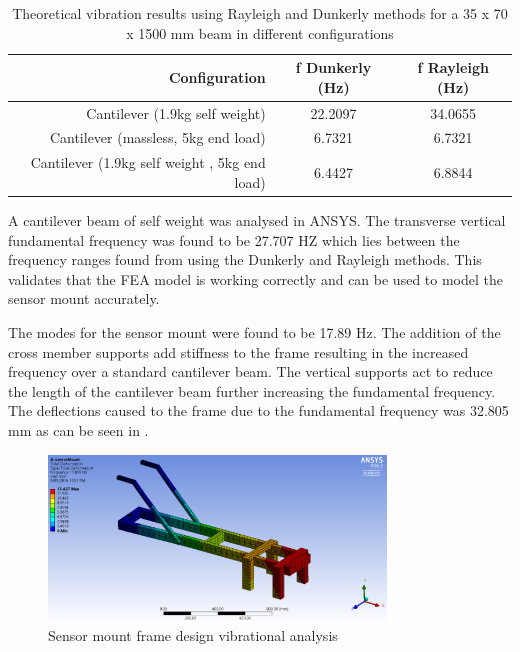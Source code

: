 \documentclass[main.tex]{subfiles}
\begin{document}

\begin{table} [ht]
\centering
\caption[Theoretical vibration results using Rayleigh and Dunkerly methods]{Theoretical vibration results using Rayleigh and Dunkerly methods for a 35 x 70 x 1500 mm beam in different configurations }
\begin{tabular} {r c c}
\toprule
Configuration & f Dunkerly (Hz) & f Rayleigh (Hz)  \\ \midrule
Cantilever (1.9kg self weight) & 22.2097 & 34.0655  \\
Cantilever (massless, 5kg end load) & 6.7321 & 6.7321 \\
Cantilever (1.9kg self weight , 5kg end load) & 6.4427 & 6.8844 \\ \bottomrule
\end{tabular}
\end{table}

A cantilever beam of self weight was analysed in ANSYS. The transverse vertical fundamental frequency was found to be 27.707 HZ which lies between the frequency ranges found from using the Dunkerly and Rayleigh methods. This validates that the FEA model is working correctly and can be used to model the sensor mount accurately.

The modes for the sensor mount were found to be 17.89 Hz. The addition of the cross member supports add stiffness to the frame resulting in the increased frequency over a standard cantilever beam. The vertical supports act to reduce the length of the cantilever beam further increasing the fundamental frequency. The deflections caused to the frame due to the fundamental frequency was 32.805 mm as can be seen in . 

\begin{figure}[ht]
\includegraphics[width=0.8\textwidth]{4-DetailedDesign/VibeAnal.PNG}
\centering
\caption{Sensor mount frame design vibrational analysis} 
\end{figure} 
\end{document}
